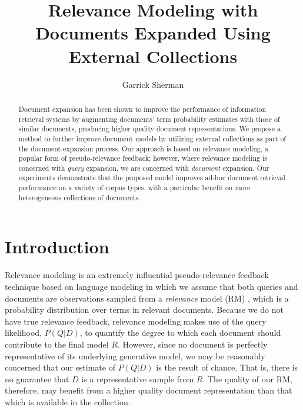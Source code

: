 \documentclass{sig-alternate}
\begin{document}
\author{Garrick Sherman}

\title{Relevance Modeling with Documents Expanded Using External Collections}

\maketitle
\begin{abstract}
Document expansion has been shown to improve the performance of information retrieval systems by augmenting documents' term probability estimates with those of similar documents, producing higher quality document representations. We propose a method to further improve document models by utilizing external collections as part of the document expansion process. Our approach is based on relevance modeling, a popular form of pseudo-relevance feedback; however, where relevance modeling is concerned with \textit{query} expansion, we are concerned with \textit{document} expansion. Our experiments demonstrate that the proposed model improves ad-hoc document retrieval performance on a variety of corpus types, with a particular benefit on more heterogeneous collections of documents.
\end{abstract}

\section{Introduction}\label{section.intro}


Relevance modeling is an extremely influential pseudo-relevance feedback technique based on language modeling in which we assume that both queries and documents are observations sampled from a \textit{relevance} model (RM) \cite{Lavrenko2001}, which is a probability distribution over terms in relevant documents. Because we do not have true relevance feedback, relevance modeling makes use of the query likelihood, $P(Q|D)$, to quantify the degree to which each document should contribute to the final model $R$. However, since no document is perfectly representative of its underlying generative model, we may be reasonably concerned that our estimate of $P(Q|D)$ is the result of chance. That is, there is no guarantee that $D$ is a representative sample from $R$. The quality of our RM, therefore, may benefit from a higher quality document representation than that which is available in the collection.
\end{document}
